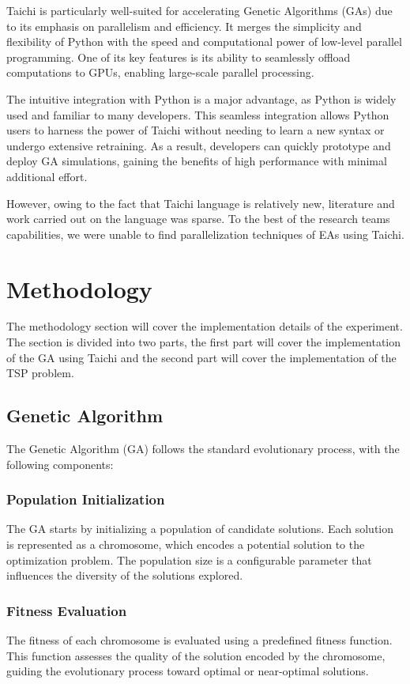 \documentclass[conference]{IEEEtran}
\begin{document}
Taichi is particularly well-suited for accelerating Genetic Algorithms (GAs)
due to its emphasis on parallelism and efficiency. It merges the simplicity and
flexibility of Python with the speed and computational power of low-level
parallel programming. One of its key features is its ability to seamlessly
offload computations to GPUs, enabling large-scale parallel processing.

The intuitive integration with Python is a major advantage, as Python is widely
used and familiar to many developers. This seamless integration allows Python
users to harness the power of Taichi without needing to learn a new syntax or
undergo extensive retraining. As a result, developers can quickly prototype and
deploy GA simulations, gaining the benefits of high performance with minimal
additional effort.

However, owing to the fact that Taichi language is relatively new, literature
and work carried out on the language was sparse. To the best of the research
teams capabilities, we were unable to find parallelization techniques of EAs
using Taichi.

\section{Methodology}
The methodology section will cover the implementation details of the
experiment. The section is divided into two parts, the first part will cover
the implementation of the GA using Taichi and the second part will cover the
implementation of the TSP problem.

\subsection{Genetic Algorithm}
The Genetic Algorithm (GA) follows the standard evolutionary process, with the
following components:

\subsubsection{Population Initialization}
The GA starts by initializing a population of candidate solutions. Each
solution is represented as a chromosome, which encodes a potential solution to
the optimization problem. The population size is a configurable parameter that
influences the diversity of the solutions explored.

\subsubsection{Fitness Evaluation}
The fitness of each chromosome is evaluated using a predefined fitness
function. This function assesses the quality of the solution encoded by the
chromosome, guiding the evolutionary process toward optimal or near-optimal
solutions.
\end{document}
